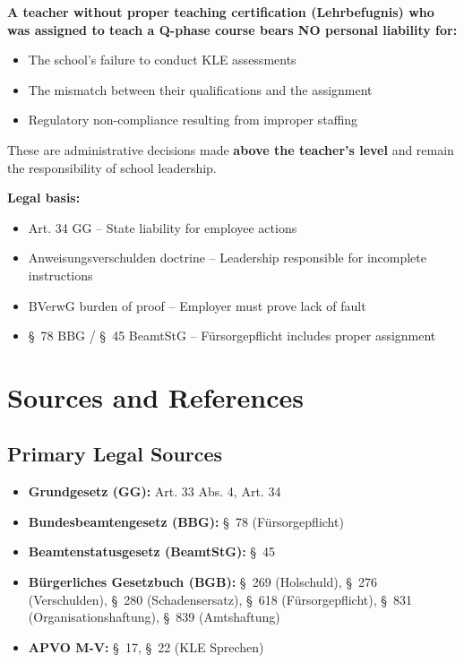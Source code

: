 \documentclass[11pt,a4paper]{article}
\begin{document}
\begin{warningbox}
\textbf{A teacher without proper teaching certification (Lehrbefugnis) who was assigned to teach a Q-phase course bears NO personal liability for:}
\begin{itemize}[nosep]
    \item The school's failure to conduct KLE assessments
    \item The mismatch between their qualifications and the assignment
    \item Regulatory non-compliance resulting from improper staffing
\end{itemize}
These are administrative decisions made \textbf{above the teacher's level} and remain the responsibility of school leadership.

\textbf{Legal basis:}
\begin{itemize}[nosep]
    \item Art. 34 GG -- State liability for employee actions
    \item Anweisungsverschulden doctrine -- Leadership responsible for incomplete instructions
    \item BVerwG burden of proof -- Employer must prove lack of fault
    \item \S~78 BBG / \S~45 BeamtStG -- Fürsorgepflicht includes proper assignment
\end{itemize}
\end{warningbox}

\section{Sources and References}

\subsection{Primary Legal Sources}

\begin{itemize}
    \item \textbf{Grundgesetz (GG):} Art. 33 Abs. 4, Art. 34
    \item \textbf{Bundesbeamtengesetz (BBG):} \S~78 (Fürsorgepflicht)
    \item \textbf{Beamtenstatusgesetz (BeamtStG):} \S~45
    \item \textbf{Bürgerliches Gesetzbuch (BGB):} \S~269 (Holschuld), \S~276 (Verschulden), \S~280 (Schadensersatz), \S~618 (Fürsorgepflicht), \S~831 (Organisationshaftung), \S~839 (Amtshaftung)
    \item \textbf{APVO M-V:} \S~17, \S~22 (KLE Sprechen)
\end{itemize}
\end{document}
